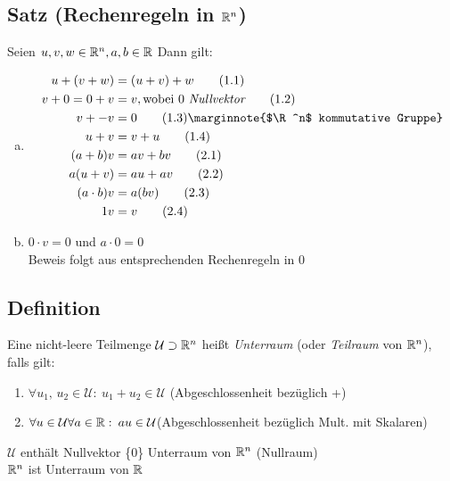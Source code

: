 \subsection{Satz (Rechenregeln in $\mathbb{R}^n$)}\label{sec:0.1}
Seien $u,v,w \in \mathbb{R}^n,a,b\in\mathbb{R}$ Dann gilt:\\
\begin{enumerate}[a)]
\item \begin{align}
u + (v + w) &= (u + v) + w \tag{1.1}\\
v + 0 = 0 + v &= v, \text{wobei } 0\ \textit{Nullvektor} \tag{1.2}\\
v + -v &= 0 \tag{1.3}\marginnote{$\R^n$ kommutative Gruppe}\\
u + v &= v + u \tag{1.4}\\
(a + b)v &= av + bv \tag{2.1}\\
a(u + v) &= au + av \tag{2.2}\\
(a \cd b)v &=a(bv)\tag{2.3}\\
1v &= v \tag{2.4}
\end{align}
\item $0 \cdot v = 0$ und $ a \cdot 0 = 0$\\
Beweis folgt aus entsprechenden Rechenregeln in 0
\end{enumerate}
\subsection{Definition}\label{sec:0.2}
Eine nicht-leere Teilmenge $\mathcal{U} \supset \mathbb{R}^n$ hei\ss t \emph{Unterraum} (oder \emph{Teilraum} von $\mathbb{R}^n$), falls gilt:
\begin{enumerate}[(1)]
\item $\forall u_1,\,u_2 \in \mathcal{U}:\: u_1 + u_2 \in \mathcal{U}$ (Abgeschlossenheit bezüglich +)
\item $\forall u \in \mathcal{U} \forall a \in \mathbb{R}:\: au \in \mathcal{U}
$(Abgeschlossenheit bezüglich Mult. mit Skalaren)
\end{enumerate}
$\mathcal{U}$ enthält Nullvektor \{0\} Unterraum von $\mathbb{R}^n$ (Nullraum)\\
$\mathbb{R}^n $ ist Unterraum von $\mathbb{R}$
